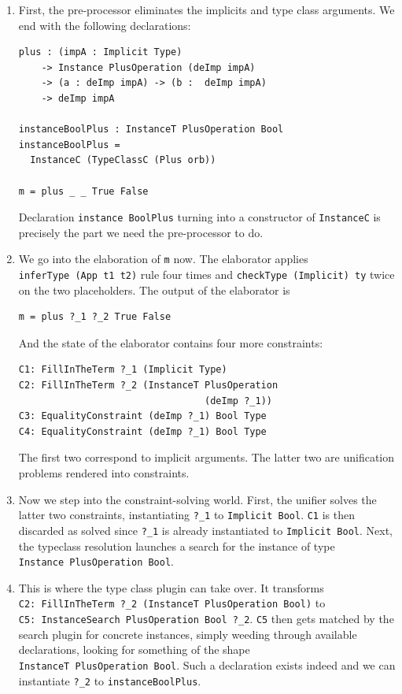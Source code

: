 \documentclass[
  sigconf,
  screen,
  review]{acmart}
\begin{document}
\begin{enumerate}
\def\labelenumi{\arabic{enumi}.}
\item
  First, the pre-processor eliminates the implicits and type class
  arguments. We end with the following declarations:

\begin{verbatim}
plus : (impA : Implicit Type)
    -> Instance PlusOperation (deImp impA)
    -> (a : deImp impA) -> (b :  deImp impA)
    -> deImp impA

instanceBoolPlus : InstanceT PlusOperation Bool
instanceBoolPlus =
  InstanceC (TypeClassC (Plus orb))

m = plus _ _ True False
\end{verbatim}

  Declaration \texttt{instance\ BoolPlus} turning into a constructor of
  \texttt{InstanceC} is precisely the part we need the pre-processor to
  do.
\item
  We go into the elaboration of \texttt{m} now. The elaborator applies
  \texttt{inferType\ (App\ t1\ t2)} rule four times and
  \texttt{checkType\ (Implicit)\ ty} twice on the two placeholders. The
  output of the elaborator is

\begin{verbatim}
m = plus ?_1 ?_2 True False
\end{verbatim}

  And the state of the elaborator contains four more constraints:

\begin{verbatim}
C1: FillInTheTerm ?_1 (Implicit Type)
C2: FillInTheTerm ?_2 (InstanceT PlusOperation
                                 (deImp ?_1))
C3: EqualityConstraint (deImp ?_1) Bool Type
C4: EqualityConstraint (deImp ?_1) Bool Type
\end{verbatim}

  The first two correspond to implicit arguments. The latter two are
  unification problems rendered into constraints.
\item
  Now we step into the constraint-solving world. First, the unifier
  solves the latter two constraints, instantiating \texttt{?\_1} to
  \texttt{Implicit\ Bool}. \texttt{C1} is then discarded as solved since
  \texttt{?\_1} is already instantiated to \texttt{Implicit\ Bool}.
  Next, the typeclass resolution launches a search for the instance of
  type \texttt{Instance\ PlusOperation\ Bool}.
\item
  This is where the type class plugin can take over. It transforms
  \texttt{C2:\ FillInTheTerm\ ?\_2\ (InstanceT\ PlusOperation\ Bool)} to
  \texttt{C5:\ InstanceSearch\ PlusOperation\ Bool\ ?\_2}. \texttt{C5}
  then gets matched by the search plugin for concrete instances, simply
  weeding through available declarations, looking for something of the
  shape \texttt{InstanceT\ PlusOperation\ Bool}. Such a declaration
  exists indeed and we can instantiate \texttt{?\_2} to
  \texttt{instanceBoolPlus}.
\end{enumerate}
\end{document}
